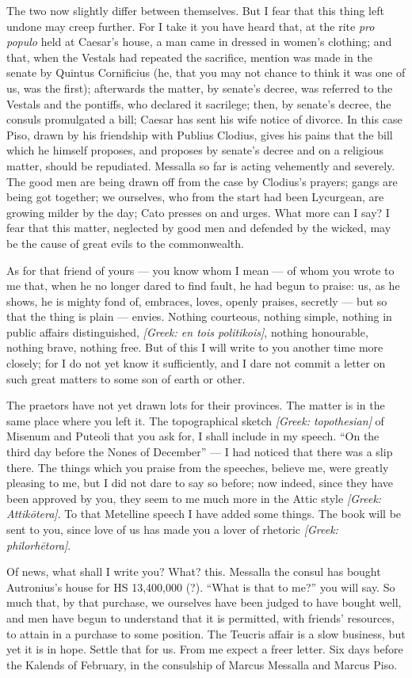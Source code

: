  The two now slightly differ between themselves. But I fear that this thing left undone may creep further. For I take it you have heard that, at the rite \textit{pro populo} held at Caesar's house, a man came in dressed in women's clothing; and that, when the Vestals had repeated the sacrifice, mention was made in the senate by Quintus Cornificius (he, that you may not chance to think it was one of us, was the first); afterwards the matter, by senate's decree, was referred to the Vestals and the pontiffs, who declared it sacrilege; then, by senate's decree, the consuls promulgated a bill; Caesar has sent his wife notice of divorce. In this case Piso, drawn by his friendship with Publius Clodius, gives his pains that the bill which he himself proposes, and proposes by senate's decree and on a religious matter, should be repudiated. Messalla so far is acting vehemently and severely. The good men are being drawn off from the case by Clodius's prayers; gangs are being got together; we ourselves, who from the start had been Lycurgean, are growing milder by the day; Cato presses on and urges. What more can I say? I fear that this matter, neglected by good men and defended by the wicked, may be the cause of great evils to the commonwealth.

 As for that friend of yours --- you know whom I mean --- of whom you wrote to me that, when he no longer dared to find fault, he had begun to praise: us, as he shows, he is mighty fond of, embraces, loves, openly praises, secretly --- but so that the thing is plain --- envies. Nothing courteous, nothing simple, nothing in public affairs distinguished, \textit{[Greek: en tois politikois]}, nothing honourable, nothing brave, nothing free. But of this I will write to you another time more closely; for I do not yet know it sufficiently, and I dare not commit a letter on such great matters to some son of earth or other.

 The praetors have not yet drawn lots for their provinces. The matter is in the same place where you left it. The topographical sketch \textit{[Greek: topothesian]} of Misenum and Puteoli that you ask for, I shall include in my speech. ``On the third day before the Nones of December'' --- I had noticed that there was a slip there. The things which you praise from the speeches, believe me, were greatly pleasing to me, but I did not dare to say so before; now indeed, since they have been approved by you, they seem to me much more in the Attic style \textit{[Greek: Attik\=otera]}. To that Metelline speech I have added some things. The book will be sent to you, since love of us has made you a lover of rhetoric \textit{[Greek: philorh\=etora]}.

 Of news, what shall I write you? What? this. Messalla the consul has bought Autronius's house for HS 13,400,000 (?). ``What is that to me?'' you will say. So much that, by that purchase, we ourselves have been judged to have bought well, and men have begun to understand that it is permitted, with friends' resources, to attain in a purchase to some position. The Teucris affair is a slow business, but yet it is in hope. Settle that for us. From me expect a freer letter. Six days before the Kalends of February, in the consulship of Marcus Messalla and Marcus Piso.
